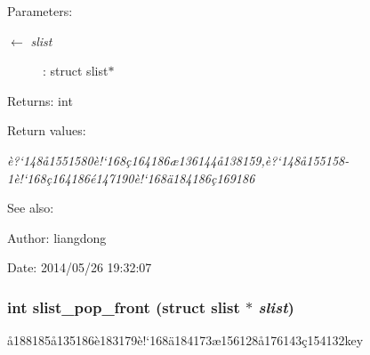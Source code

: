 \begin{Desc}
\item[Parameters:]
\begin{description}
\item[\mbox{$\leftarrow$} {\em slist}]: struct slist$\ast$ \end{description}
\end{Desc}
\begin{Desc}
\item[Returns:]int \end{Desc}
\begin{Desc}
\item[Return values:]
\begin{description}
\item[{\em \`{e}?`148\aa{}1551580\`{e}!`168\c{c}164186\ae{}136144\aa{}138159,\`{e}?`148\aa{}155158-1\`{e}!`168\c{c}164186\'{e}147190\`{e}!`168\"{a}184186\c{c}169186}]\end{description}
\end{Desc}
\begin{Desc}
\item[See also:]\end{Desc}
\begin{Desc}
\item[Author:]liangdong \end{Desc}
\begin{Desc}
\item[Date:]2014/05/26 19:32:07 \end{Desc}
\subsubsection{\setlength{\rightskip}{0pt plus 5cm}int slist\_\-pop\_\-front (struct slist $\ast$ {\em slist})}\label{slist_8c_a13}


\aa{}188185\aa{}135186\`{e}183179\`{e}!`168\"{a}184173\ae{}156128\aa{}176143\c{c}154132key 

